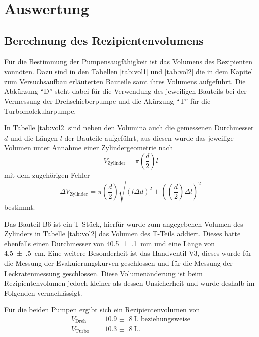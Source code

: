 \newpage
\section{Auswertung}
\label{sec:Auswertung}

\subsection{Berechnung des Rezipientenvolumens}
\label{sec:Volumina}

Für die Bestimmung der Pumpensaugfähigkeit ist das Volumens des Rezipienten
vonnöten. Dazu sind in den Tabellen \ref{tab:vol1} und \ref{tab:vol2} die
in dem Kapitel zum Versuchsaufbau erläuterten Bauteile samt ihres Volumens aufgeführt.
Die Abkürzung \enquote{D} steht dabei für die Verwendung
des jeweiligen Bauteils bei der Vermessung der
Drehschieberpumpe und die Akürzung \enquote{T} für die Turbomolekularpumpe.



In Tabelle \ref{tab:vol2} sind neben den Volumina auch die gemessenen
Durchmesser $d$ und die Längen $l$ der Bauteile aufgeführt, aus diesen wurde
das jeweilige Volumen unter Annahme einer Zylindergeometrie nach
\begin{equation*}
  V_\text{Zylinder} = \pi \left(\frac{d}{2}\right) l
\end{equation*}
mit dem zugehörigen Fehler
\begin{equation*}
  \Delta V_\text{Zylinder} =
  \pi \left(\frac{d}{2}\right) \sqrt{
  \left(l \Delta d \right)^2 +
  \left(\left(\frac{d}{2}\right) \Delta l\right)^2}
\end{equation*}
bestimmt.



Das Bauteil B6 ist ein T-Stück, hierfür wurde zum angegebenen Volumen des Zylinders
in Tabelle \ref{tab:vol2}
das Volumen des T-Teils addiert. Dieses hatte ebenfalls einen Durchmesser
von \SI{40.5(1)}{\milli\meter} und eine Länge von \SI{4.5(5)}{\centi\meter}.
Eine weitere Besonderheit ist das Handventil V3, dieses wurde für die Messung
der Evakuierungskurven geschlossen und für die Messung der Leckratenmessung
geschlossen. Diese Volumenänderung ist beim Rezipientenvolumen jedoch kleiner
als dessen Unsicherheit und
wurde deshalb im Folgenden vernachlässigt.

Für die beiden Pumpen ergibt sich ein Rezipientenvolumen von
\begin{align*}
  V_\text{Dreh} &= \SI{10.9(8)}{\liter} \text{ beziehungsweise}\\
  V_\text{Turbo} &= \SI{10.3(8)}{\liter}.
\end{align*}

